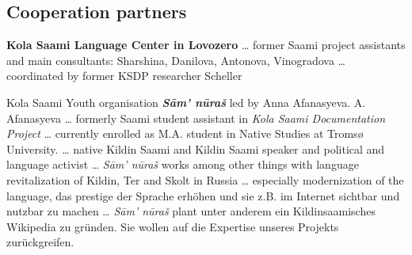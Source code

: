 \documentclass[a4paper,12pt]{article}
\begin{document}
\subsection{Cooperation partners}

{\bf Kola Saami Language Center in Lovozero} … former Saami project assistants and main consultants: Sharshina, Danilova, Antonova, Vinogradova … coordinated by former KSDP researcher Scheller

Kola Saami Youth organisation \textit{\textbf{Sām' nūraš}}  led by Anna Afanasyeva. A.\,Afanasyeva … formerly Saami student assistant in {\it Kola Saami Documentation Project} … currently enrolled as M.A. student in Native Studies at Tromsø University. … native Kildin Saami and Kildin Saami speaker and political and language activist … {\it Sām' nūraš} works among other things with language revitalization of Kildin, Ter and Skolt in Russia … especially modernization of the language, das prestige der Sprache erhöhen und sie z.B. im Internet sichtbar und nutzbar zu machen … {\it Sām' nūraš} plant unter anderem ein Kildinsaamisches Wikipedia  zu gründen. Sie wollen auf die Expertise unseres Projekts zurückgreifen.
\end{document}
